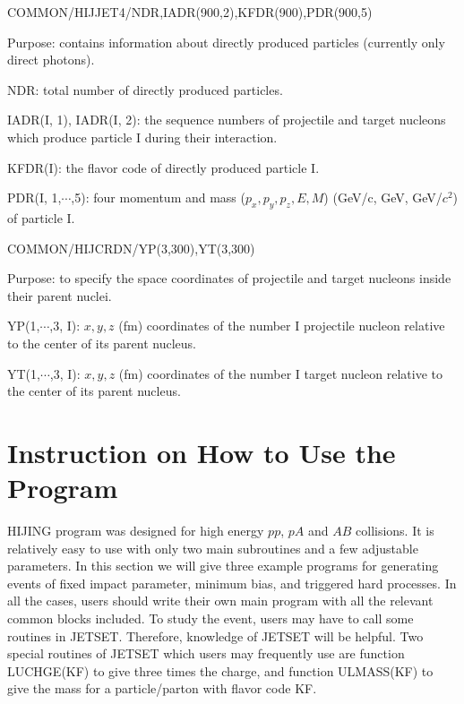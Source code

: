 \begin{description}
\itemsep=-4.0pt
\item{}COMMON/HIJJET4/NDR,IADR(900,2),KFDR(900),PDR(900,5)
\item{}Purpose: contains information about directly produced particles
                (currently only direct photons).
\item{}NDR: total number of directly produced particles.
\item{}IADR(I, 1), IADR(I, 2): the sequence numbers of projectile and
                target nucleons which produce particle I during their
                interaction.
\item{}KFDR(I): the flavor code of directly produced particle I.
\item{}PDR(I, 1,$\cdots$,5): four momentum and mass ($p_x,p_y,p_z,E,M$)
                (GeV/c, GeV, GeV/$c^2$) of  particle I.
\end{description}

\begin{description}
\itemsep=-4.0pt
\item{}COMMON/HIJCRDN/YP(3,300),YT(3,300)
\item{}Purpose: to specify the space coordinates of projectile and
                target nucleons inside their parent nuclei.
\item{}YP(1,$\cdots$,3, I): $x,y,z$ (fm) coordinates of the number 
                I projectile nucleon relative to the center of its 
                parent nucleus.
\item{}YT(1,$\cdots$,3, I): $x,y,z$ (fm) coordinates of the number I target 
                nucleon relative to the center of its parent nucleus.
\end{description}

\section{Instruction on How to Use the Program}

        HIJING program was designed for high energy $pp$, $pA$ and $AB$ 
collisions. It is relatively easy to use with only two main
subroutines and a few adjustable parameters. In this section we will 
give three example programs for generating events of fixed impact
parameter, minimum bias, and triggered hard processes. In all the
cases, users should write their own main program with all the relevant
common blocks included. To study the event, users may  have to call 
some routines in JETSET. Therefore, knowledge of JETSET will be helpful.
Two special routines of JETSET which users may frequently use are
function LUCHGE(KF) to give three times the charge, and function
ULMASS(KF) to give the mass for a particle/parton with flavor code
KF.

